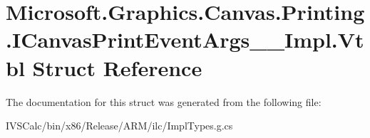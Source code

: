 \hypertarget{struct_microsoft_1_1_graphics_1_1_canvas_1_1_printing_1_1_i_canvas_print_event_args_____impl_1_1_vtbl}{}\section{Microsoft.\+Graphics.\+Canvas.\+Printing.\+I\+Canvas\+Print\+Event\+Args\+\_\+\+\_\+\+Impl.\+Vtbl Struct Reference}
\label{struct_microsoft_1_1_graphics_1_1_canvas_1_1_printing_1_1_i_canvas_print_event_args_____impl_1_1_vtbl}


The documentation for this struct was generated from the following file\+:\begin{DoxyCompactItemize}
\item 
I\+V\+S\+Calc/bin/x86/\+Release/\+A\+R\+M/ilc/Impl\+Types.\+g.\+cs\end{DoxyCompactItemize}
